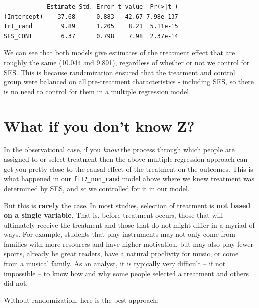 \documentclass[
  letterpaper,
  DIV=11,
  numbers=noendperiod]{scrreprt}
\theoremstyle{definition}
\theoremstyle{remark}
\begin{document}
\begin{verbatim}
            Estimate Std. Error t value  Pr(>|t|)
(Intercept)    37.68      0.883   42.67 7.98e-137
Trt_rand        9.89      1.205    8.21  5.11e-15
SES_CONT        6.37      0.798    7.98  2.37e-14
\end{verbatim}

We can see that both models give estimates of the treatment effect that
are roughly the same (10.044 and 9.891), regardless of whether or not we
control for SES. This is because randomization ensured that the
treatment and control group were balanced on all pre-treatment
characteristics - including SES, so there is no need to control for them
in a multiple regression model.

\hypertarget{what-if-you-dont-know-z}{%
\section{What if you don't know Z?}\label{what-if-you-dont-know-z}}

In the observational case, if you \emph{know} the process through which
people are assigned to or select treatment then the above multiple
regression approach can get you pretty close to the causal effect of the
treatment on the outcomes. This is what happened in our
\texttt{fit2\_non\_rand} model above where we knew treatment was
determined by SES, and so we controlled for it in our model.

But this is \textbf{rarely} the case. In most studies, selection of
treatment is \textbf{not based on a single variable}. That is, before
treatment occurs, those that will ultimately receive the treatment and
those that do not might differ in a myriad of ways. For example,
students that play instruments may not only come from families with more
resources and have higher motivation, but may also play fewer sports,
already be great readers, have a natural proclivity for music, or come
from a musical family. As an analyst, it is typically very difficult --
if not impossible -- to know how and why some people selected a
treatment and others did not.

Without randomization, here is the best approach:
\end{document}
